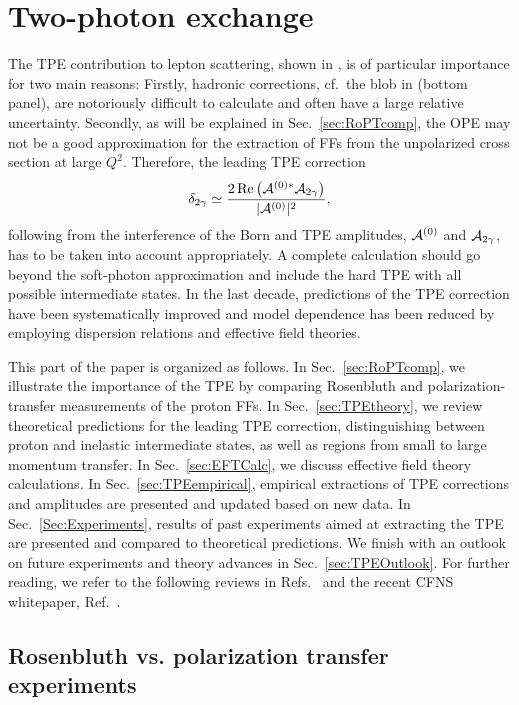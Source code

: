 \section{Two-photon exchange}\label{sec:TPE}

The TPE contribution to lepton scattering, shown in , is of particular importance for two main reasons: Firstly,  hadronic corrections, cf.\ the blob in  (bottom panel), are notoriously difficult to calculate and often have a large relative uncertainty. Secondly, as will be explained in Sec.~\ref{sec:RoPTcomp}, the OPE may not be a good approximation for the extraction of FFs from the unpolarized cross section at large $Q^2$. Therefore, the leading TPE correction 
\begin{equation}
\label{delta2gTPE}
\delta_{2\gamma}   \simeq   \frac{2\operatorname{Re} \big({\mathcal A}^{(0)*} {\mathcal A}_{2\gamma}\big)} {|{\mathcal A}^{(0)}|^2},
\end{equation}
following from the interference of the Born and TPE amplitudes, ${\mathcal A}^{(0)}$ and ${\mathcal A}_{2\gamma}$, has to be taken into account appropriately. A complete calculation should go beyond the soft-photon approximation and include the hard TPE with all possible intermediate states. In the last decade, predictions of the TPE correction have been systematically improved and model dependence has been reduced by employing dispersion relations and effective field theories. 


This part of the paper is organized as follows. In Sec.~\ref{sec:RoPTcomp}, we illustrate the importance of the TPE by comparing Rosenbluth and polarization-transfer measurements of the proton FFs. In Sec.~\ref{sec:TPEtheory}, we review theoretical predictions for the leading TPE correction, distinguishing between proton and inelastic intermediate states, as well as regions from small to large momentum transfer. In Sec.~\ref{sec:EFTCalc}, we discuss effective field theory calculations. In Sec.~\ref{sec:TPEempirical}, empirical extractions of TPE corrections and amplitudes are presented and updated based on new data.  In Sec.~\ref{Sec:Experiments}, results of past experiments  aimed at extracting the TPE  are presented and compared to theoretical predictions. We finish with an outlook on future experiments and theory advances in Sec.~\ref{sec:TPEOutlook}. For further reading, we refer to the following reviews in Refs.~\cite{Carlson:2007sp, Arrington:2011dn,Afanasev:2017gsk,Borisyuk:2019gym} and the recent CFNS whitepaper, Ref.~\cite{Afanasev:2020hwg}.

\subsection{Rosenbluth vs. polarization transfer experiments}





